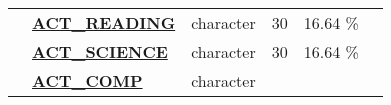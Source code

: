 \documentclass[]{article}
\begin{document}
\begin{longtable}[]{@{}lllrcl@{}}
\begin{minipage}[t]{0.08\columnwidth}\raggedright\strut
\strut
\end{minipage} & \begin{minipage}[t]{0.28\columnwidth}\raggedright\strut
\textbf{\protect\hyperlink{act_reading}{ACT\_READING}}\strut
\end{minipage} & \begin{minipage}[t]{0.12\columnwidth}\raggedright\strut
character\strut
\end{minipage} & \begin{minipage}[t]{0.11\columnwidth}\raggedleft\strut
30\strut
\end{minipage} & \begin{minipage}[t]{0.10\columnwidth}\centering\strut
16.64 \%\strut
\end{minipage} & \begin{minipage}[t]{0.13\columnwidth}\raggedright\strut
\strut
\end{minipage}\tabularnewline
\begin{minipage}[t]{0.08\columnwidth}\raggedright\strut
\strut
\end{minipage} & \begin{minipage}[t]{0.28\columnwidth}\raggedright\strut
\textbf{\protect\hyperlink{act_science}{ACT\_SCIENCE}}\strut
\end{minipage} & \begin{minipage}[t]{0.12\columnwidth}\raggedright\strut
character\strut
\end{minipage} & \begin{minipage}[t]{0.11\columnwidth}\raggedleft\strut
30\strut
\end{minipage} & \begin{minipage}[t]{0.10\columnwidth}\centering\strut
16.64 \%\strut
\end{minipage} & \begin{minipage}[t]{0.13\columnwidth}\raggedright\strut
\strut
\end{minipage}\tabularnewline
\begin{minipage}[t]{0.08\columnwidth}\raggedright\strut
\strut
\end{minipage} & \begin{minipage}[t]{0.28\columnwidth}\raggedright\strut
\textbf{\protect\hyperlink{act_comp}{ACT\_COMP}}\strut
\end{minipage} & \begin{minipage}[t]{0.12\columnwidth}\raggedright\strut
character\strut
\end{minipage} & \begin{minipage}[t]{0.11\columnwidth}\raggedleft\strut

\end{minipage}
\end{longtable}
\end{document}

